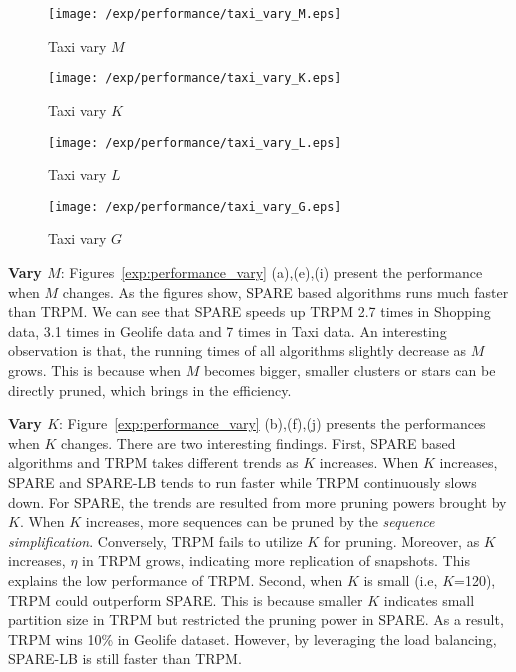 \begin{figure*}[t]
    \begin{subfigure}[b]{0.23\textwidth}
        \texttt{[image: /exp/performance/taxi\_vary\_M.eps]}
        \caption{Taxi vary $M$}
    \end{subfigure}
    \begin{subfigure}[b]{0.23\textwidth}
        \texttt{[image: /exp/performance/taxi\_vary\_K.eps]}
        \caption{Taxi vary $K$}
    \end{subfigure}
    \begin{subfigure}[b]{0.23\textwidth}
        \texttt{[image: /exp/performance/taxi\_vary\_L.eps]}
        \caption{Taxi vary $L$}
    \end{subfigure}
       \begin{subfigure}[b]{0.23\textwidth}
        \texttt{[image: /exp/performance/taxi\_vary\_G.eps]}
        \caption{Taxi vary $G$}
    \end{subfigure}       
\caption{Performance of SPARE and TRPM on real datasets under different pattern parameters.}
\label{exp:performance_vary}
\end{figure*}
\textbf{Vary $M$}: Figures~\ref{exp:performance_vary} (a),(e),(i)
present the performance when $M$ changes.
As the figures show, SPARE based algorithms runs much faster than TRPM. We can see that SPARE
speeds up TRPM 2.7 times in Shopping data, 3.1 times in Geolife data and
7 times in Taxi data. An interesting observation is that, the running times
of all algorithms slightly decrease as $M$ grows. This is
because when $M$ becomes bigger, smaller clusters or stars can be directly pruned, which brings in the efficiency.

\textbf{Vary $K$}: Figure~\ref{exp:performance_vary} (b),(f),(j) 
presents the performances when $K$ changes. 
There are two interesting findings. 
First, SPARE based algorithms and TRPM takes different trends as $K$ increases. 
When $K$ increases, SPARE and SPARE-LB tends to run faster
while TRPM continuously slows down. For SPARE, the trends are resulted from more pruning powers brought
by $K$. When $K$ increases, more sequences can be pruned by the \emph{sequence simplification}.
Conversely, TRPM fails to utilize $K$ for pruning. Moreover, as $K$ increases, $\eta$ in TRPM grows, indicating more replication of snapshots. 
This explains the low performance of TRPM.  Second, when $K$ is small (i.e, $K$=120), TRPM could outperform SPARE. This is because smaller $K$ indicates small partition size in TRPM but restricted the pruning power in SPARE. As a result, TRPM wins 10\% in Geolife dataset. However, by leveraging the load balancing, SPARE-LB is still faster than TRPM.

